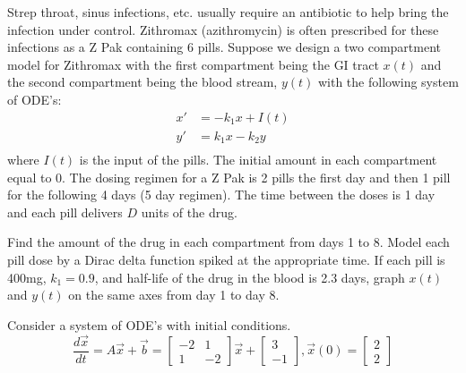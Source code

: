 \documentclass[
	number={5},
]{math486homework}
\begin{document}
\maketitle

\begin{problems}
	\problem Strep throat, sinus infections, etc. usually require an antibiotic to help bring the infection under control.
	Zithromax (azithromycin) is often prescribed for these infections as a Z Pak containing 6 pills.
	Suppose we design a two compartment model for Zithromax with the first compartment being the GI tract $x(t)$ and the second compartment being the blood stream, $y(t)$ with the following system of ODE's:
	\begin{equation*}
	\begin{aligned}
		x' &= -k_{1}x + I(t)\\
		y' &= k_{1}x - k_{2}y\\
	\end{aligned}
	\end{equation*}
	where $I(t)$ is the input of the pills.
	The initial amount in each compartment equal to 0.
	The dosing regimen for a Z Pak is 2 pills the first day and then 1 pill for the following 4 days (5 day regimen).
	The time between the doses is 1 day and each pill delivers $D$ units of the drug.
	\begin{problems}
		\subproblem Find the amount of the drug in each compartment from days 1 to 8.
		Model each pill dose by a Dirac delta function spiked at the appropriate time. 
		\subproblem If each pill is 400mg, $k_{1} = 0.9$, and half-life of the drug in the blood is 2.3 days, graph $x(t)$ and $y(t)$ on the same axes from day 1 to day 8. 
	\end{problems}
	\problem Consider a system of ODE's with initial conditions.
	\begin{equation}
		\frac{d\vec{x}}{dt} = A\vec{x} + \vec{b} = \left[ \begin{array}{cc}
			-2 & 1\\
			1 & -2
		\end{array} \right]\vec{x} + \left[ \begin{array}{c}
			3\\
			-1
		\end{array} \right], \vec{x}(0) = \left[ \begin{array}{c}
			2\\
			2
		\end{array} \right]
		\label{eq:1}
	\end{equation}

\end{problems}
\end{document}
